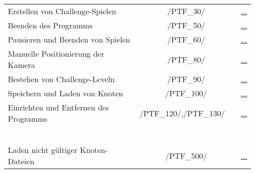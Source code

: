 \begin{longtable}{p{0.5\hsize}p{0.275\hsize}p{0.275\hsize}}
	 \multicolumn{1}{L{6.5cm}}{Erstellen von Challenge-Spielen}
	& \multicolumn{1}{c}{/PTF\_30/}
	& \multicolumn{1}{c}{\hyperref[]{...}}
	
	\\
	
	  \multicolumn{1}{L{6.5cm}}{Beenden des Programms}
	& \multicolumn{1}{c}{/PTF\_50/}
	& \multicolumn{1}{c}{\hyperref[]{...}}
	
	\\
	
	  \multicolumn{1}{L{6.5cm}}{Pausieren und Beenden von Spielen}
	& \multicolumn{1}{c}{/PTF\_60/}
	& \multicolumn{1}{c}{\hyperref[]{...}}
	
	\\
	
	  \multicolumn{1}{L{6.5cm}}{Manuelle Positionierung der Kamera}
	& \multicolumn{1}{c}{/PTF\_80/}
	& \multicolumn{1}{c}{\hyperref[]{...}}
	
	\\
	
	  \multicolumn{1}{L{6.5cm}}{Bestehen von Challenge-Leveln}
	& \multicolumn{1}{c}{/PTF\_90/}
	& \multicolumn{1}{c}{\hyperref[]{...}}
	
	\\
	
	  \multicolumn{1}{L{6.5cm}}{Speichern und Laden von Knoten}
	& \multicolumn{1}{c}{/PTF\_100/}
	& \multicolumn{1}{c}{\hyperref[]{...}}
	
	\\
	
	  \multicolumn{1}{L{6.5cm}}{Einrichten und Entfernen des Programms}
	& \multicolumn{1}{C{3cm}}{/PTF\_120/,\newline/PTF\_130/~~}
	& \multicolumn{1}{c}{\hyperref[]{...}}
	
	\\
	


\newpage




	  \multicolumn{3}{l}{\textbf{Negativtests:}}
	  
	\\
	
	  \multicolumn{3}{l}{~}
	  
	\\
	
	  \multicolumn{1}{L{6.5cm}}{Laden nicht gültiger Knoten-Dateien}
	& \multicolumn{1}{c}{/PTF\_500/}
	& \multicolumn{1}{c}{\hyperref[]{...}}
	

\end{longtable}

